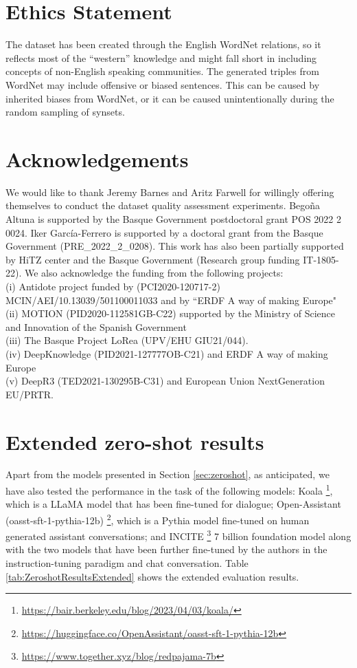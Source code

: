 \documentclass[11pt]{article}
\newcommand{\WORDNET}{WordNet}
\begin{document}
\section*{Ethics Statement}
The dataset has been created through the English \WORDNET{} relations, so it reflects most of the ``western'' knowledge and might fall short in including concepts of non-English speaking communities. 
The generated triples from \WORDNET{} may include offensive or biased sentences. This can be caused by inherited biases from \WORDNET{}, or it can be caused unintentionally during the random sampling of synsets. 

\section*{Acknowledgements}
We would like to thank Jeremy Barnes and Aritz Farwell for willingly offering themselves to conduct the dataset quality assessment experiments. Begoña Altuna is supported by the Basque Government postdoctoral grant POS 2022 2 0024. Iker García-Ferrero is supported by a doctoral grant from the Basque Government (PRE\_2022\_2\_0208).  
This work has also been partially supported by HiTZ center and the Basque Government (Research group funding IT-1805-22). We also acknowledge the funding from the following projects: \\
(i) Antidote project funded by (PCI2020-120717-2) MCIN/AEI/10.13039/501100011033  and by ``ERDF A way of making Europe" \\
(ii) MOTION (PID2020-112581GB-C22) supported by the Ministry of Science and Innovation of the Spanish Government \\
(iii) The Basque Project LoRea (UPV/EHU GIU21/044). \\
(iv) DeepKnowledge (PID2021-127777OB-C21) and ERDF A way of making Europe \\
(v) DeepR3 (TED2021-130295B-C31) and European Union NextGeneration EU/PRTR.





\appendix



\section{Extended zero-shot results}
\label{sec:ExtendedZeroShot}

Apart from the models presented in Section \ref{sec:zeroshot}, as anticipated, we have also tested the performance in the task of the following models: Koala \footnote{\url{https://bair.berkeley.edu/blog/2023/04/03/koala/}}, which is a LLaMA model that has been fine-tuned for dialogue; Open-Assistant (oasst-sft-1-pythia-12b) \footnote{\url{https://huggingface.co/OpenAssistant/oasst-sft-1-pythia-12b}}, which is a Pythia model fine-tuned on human generated assistant conversations; and INCITE \footnote{\url{https://www.together.xyz/blog/redpajama-7b}} 7 billion foundation model along with the two models that have been further fine-tuned by the authors in the instruction-tuning paradigm and chat conversation. Table \ref{tab:ZeroshotResultsExtended} shows the extended evaluation results. 
\end{document}
